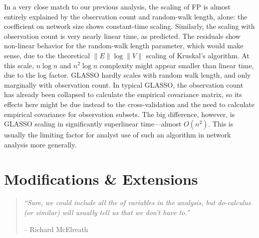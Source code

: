 \documentclass[%
	12pt,
		oneside,
		letterpaper
]{book}
\begin{document}
In a very close match to our previous analysis, the scaling of FP is almost entirely explained by the observation count and random-walk length, alone: the coefficient on network size shows constant-time scaling.
Similarly, the scaling with observation count is very nearly linear time, as predicted.
The residuals show non-linear behavior for the random-walk length parameter, which would make sense, due to the theoretical \(\|E\|\log\|V\|\) scaling of Kruskal's algorithm.
At this scale, \(n\log n\) and \(n^2\log n\) complexity might appear smaller than linear time, due to the log factor.
GLASSO hardly scales with random walk length, and only marginally with observation count.
In typical GLASSO, the observation count has already been collapsed to calculate the empirical covariance matrix, so its effects here might be due instead to the cross-validation and the need to calculate empirical covariance for observation subsets.
The big difference, however, is GLASSO scaling in significantly superlinear time---almost \(O(n^2)\).
This is usually the limiting factor for analyst use of such an algorithm in network analysis more generally.

\chapter{Modifications \& Extensions}\label{sec-extend}

\begin{flushright}

\begin{minipage}{.7\linewidth}

\singlespacing

\begin{quote}
\emph{``Sure, we could include all the of variables in the analysis, but do-calculus (or similar) will usually tell us that we don't have to.''}

\hfill -- Richard McElreath\\
\doublespacing
\end{quote}

\end{minipage}

\end{flushright}
\end{document}
